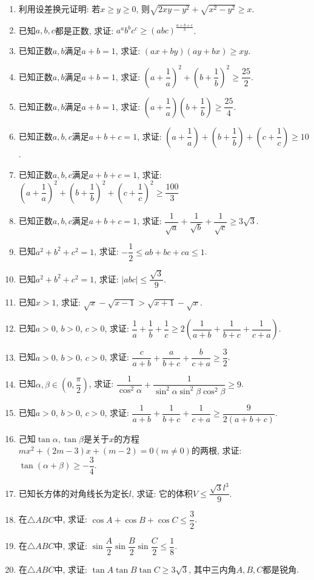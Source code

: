 \documentclass[10pt,a4paper]{article}
\begin{document}
\begin{enumerate}[1.]
\item 利用设差换元证明: 若$x\ge y\ge 0$, 则$\sqrt{2xy-{y^2}}+\sqrt{x^2-y^2}\ge x$.
\item 已知$a,b,c$都是正数, 求证: $a^ab^bc^c\ge (abc)^{\frac{a+b+c}3}$.
\item 已知正数$a,b$满足$a+b=1$, 求证: $(ax+by)(ay+bx)\ge xy$.
\item 已知正数$a,b$满足$a+b=1$, 求证: $(a+\dfrac 1a)^2+(b+\dfrac 1b)^2\ge \dfrac{25}2$.
\item 已知正数$a,b$满足$a+b=1$, 求证: $(a+\dfrac 1a)(b+\dfrac 1b)\ge \dfrac{25}4$.
\item 已知正数$a,b,c$满足$a+b+c=1$, 求证: $(a+\dfrac 1a)+(b+\dfrac 1b)+(c+\dfrac 1c)\ge 10$.
\item 已知正数$a,b,c$满足$a+b+c=1$, 求证: $(a+\dfrac 1a)^2+(b+\dfrac 1b)^2+(c+\dfrac 1c)^2\ge \dfrac{100}3$
\item 已知正数$a,b,c$满足$a+b+c=1$, 求证: $\dfrac 1{\sqrt a}+\dfrac 1{\sqrt b}+\dfrac 1{\sqrt c}\ge 3\sqrt 3$.
\item 已知$a^2+b^2+c^2=1$, 求证: $-\dfrac 12\le ab+bc+ca\le 1$.					
\item 已知$a^2+b^2+c^2=1$, 求证: $|abc|\le \dfrac{\sqrt 3}9$.
\item 已知$x>1$, 求证: $\sqrt x-\sqrt{x-1}>\sqrt{x+1}-\sqrt x$.
\item 已知$a>0$, $b>0$, $c>0$, 求证: $\dfrac 1a+\dfrac 1b+\dfrac 1c\ge 2(\dfrac 1{a+b}+\dfrac 1{b+c}+\dfrac 1{c+a})$.
\item 已知$a>0$, $b>0$, $c>0$, 求证: $\dfrac c{a+b}+\dfrac a{b+c}+\dfrac b{c+a}\ge \dfrac 32$.
\item 已知$\alpha ,\beta \in (0,\dfrac{\pi}2)$, 求证: $\dfrac 1{\cos^2\alpha}+\dfrac 1{\sin^2\alpha \sin^2\beta\cos^2\beta}\ge 9$.
\item 已知$a>0$, $b>0$, $c>0$, 求证: $\dfrac 1{a+b}+\dfrac 1{b+c}+\dfrac 1{c+a}\ge \dfrac 9{2(a+b+c)}$.
\item 己知$\tan \alpha,\tan \beta$是关于$x$的方程$mx^2+(2m-3)x+(m-2)=0(m\ne 0)$的两根, 求证: $\tan (\alpha +\beta)\ge -\dfrac 34$.
\item 已知长方体的对角线长为定长$l$, 求证: 它的体积$V\le \dfrac{\sqrt 3l^3}9$.
\item 在$\triangle ABC$中, 求证: $\cos A+\cos B+\cos C\le \dfrac 32$.
\item 在$\triangle ABC$中, 求证: $\sin \dfrac A2\sin \dfrac B2\sin \dfrac C2\le \dfrac 18$.
\item 在$\triangle ABC$中, 求证: $\tan A\tan B\tan C\ge 3\sqrt 3$, 其中三内角$A,B,C$都是锐角.

\end{enumerate}
\end{document}
